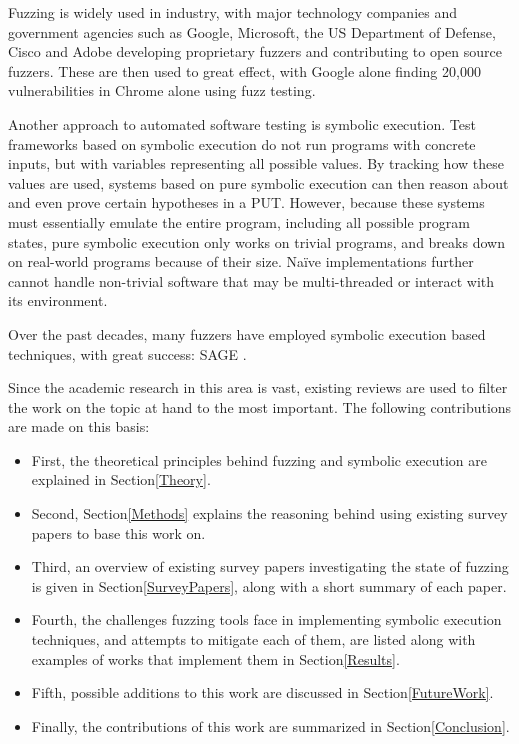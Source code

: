 \documentclass{article}
\begin{document}
\begin{multicols}{2}
    Fuzzing is widely used in industry, with major technology companies and government agencies such as Google, Microsoft, the US Department of Defense, Cisco and Adobe developing proprietary fuzzers and contributing to open source fuzzers. These are then used to great effect, with Google alone finding 20,000 vulnerabilities in Chrome alone using fuzz testing.\cite{Demystifying}

    Another approach to automated software testing is symbolic execution\cite{Symbex}. Test frameworks based on symbolic execution do not run programs with concrete inputs, but with variables representing all possible values. By tracking how these values are used, systems based on pure symbolic execution can then reason about and even prove certain hypotheses in a PUT. However, because these systems must essentially emulate the entire program, including all possible program states, pure symbolic execution only works on trivial programs, and breaks down on real-world programs because of their size. Naïve implementations further cannot handle non-trivial software that may be multi-threaded or interact with its environment.

    Over the past decades, many fuzzers\cite{BitBlaze,CORAL,CREST,CUTE,CVC5,CVCLite,Chopped,Cyberdyne,DART,DTSA,DiSE,DigFuzz,Dowser,Driller,EGT,EXE,Fitnex,FloPSy,GRT,GSE,HCT,HFL,IFL,Intriguer,JFS,KATCH,KLEE,KLEEFP,LATEST,MoWF,Moles,PYGMALION,Pangolin,Pex,QSYM,QuickFuzz,RWset,SAGE,SAVIOR,SMART,SPIN,STP,ScalableAutomatedMethods,TFuzz,TaintScope,VUzzer,SPF} have employed symbolic execution based techniques, with great success: SAGE\cite{SAGE} \cite{FuzzingTheStateOfTheArt}.

    Since the academic research in this area is vast, existing reviews are used to filter the work on the topic at hand to the most important. The following contributions are made on this basis:

    \begin{itemize}
        \item First, the theoretical principles behind fuzzing and symbolic execution are explained in Section\ref{Theory}.
        \item Second, Section\ref{Methods} explains the reasoning behind using existing survey papers to base this work on.
        \item Third, an overview of existing survey papers investigating the state of fuzzing is given in Section\ref{SurveyPapers}, along with a short summary of each paper.
        \item Fourth, the challenges fuzzing tools face in implementing symbolic execution techniques, and attempts to mitigate each of them, are listed along with examples of works that implement them in Section\ref{Results}.
        \item Fifth, possible additions to this work are discussed in Section\ref{FutureWork}.
        \item Finally, the contributions of this work are summarized in Section\ref{Conclusion}.
    \end{itemize}


\end{multicols}
\end{document}
